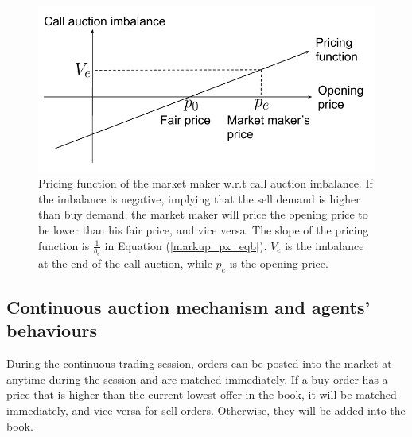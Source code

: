 \documentclass{article}
\begin{document}
\begin{figure}[h]
  \includegraphics[width=\textwidth]{MMPricing}
  \caption{Pricing function of the market maker w.r.t call auction imbalance. If the imbalance is negative, implying that the sell demand is higher than buy demand, the market maker will price the opening price to be lower than his fair price, and vice versa. The slope of the pricing function is $\frac{1}{b_e}$ in Equation (\ref{markup_px_eqb}). $V_e$ is the imbalance at the end of the call auction, while $p_e$ is the opening price. }
  \label{fig:mm_pricing_auction}
\end{figure}

\subsection{Continuous auction mechanism and agents' behaviours}\label{subsec:AnalyticalFrameworkContinuousAuction}
During the continuous trading session, orders can be posted into the market at anytime during the session and are matched immediately. If a buy order has a price that is higher than the current lowest offer in the book, it will be matched immediately, and vice versa for sell orders. Otherwise, they will be added into the book.
\end{document}
